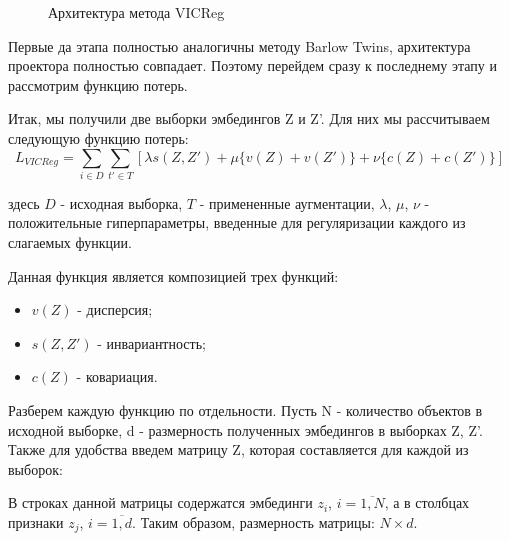\begin{figure}[H]
        \caption{Архитектура метода VICReg}
        \label{VICReg_arch}
\end{figure} 

Первые да этапа полностью аналогичны методу Barlow Twins, архитектура проектора полностью совпадает. Поэтому перейдем сразу к последнему этапу и рассмотрим функцию потерь.

Итак, мы получили две выборки эмбедингов Z и Z'. Для них мы рассчитываем следующую функцию потерь:
$$
L_{VICReg}=\sum_{i\in D}\sum_{t'\in T} \left[\lambda s(Z, Z')+\mu\{v(Z)+v(Z')\}+\nu\{c(Z)+c(Z')\}\right]
$$

здесь $D$ - исходная выборка, $T$ - примененные аугментации, $\lambda$, $\mu$, $\nu$ - положительные гиперпараметры, введенные для регуляризации каждого из слагаемых функции.

Данная функция является композицией трех функций: 
\begin{itemize}
    \item $v(Z)$ - дисперсия;
    \item $s(Z, Z')$ - инвариантность;
    \item $c(Z)$ - ковариация.
\end{itemize}

Разберем каждую функцию по отдельности. Пусть N - количество объектов в исходной выборке, d - размерность полученных эмбедингов в выборках Z, Z'. Также для удобства введем матрицу Z, которая составляется для каждой из выборок:
\begin{figure}[H]
        \label{ris:image}
\end{figure}
В строках данной матрицы содержатся эмбединги $z_i$, $i=\overline{1, N}$, а в столбцах признаки $z_j$, $i=\overline{1, d}$. Таким образом, размерность матрицы: $N\times d$.


